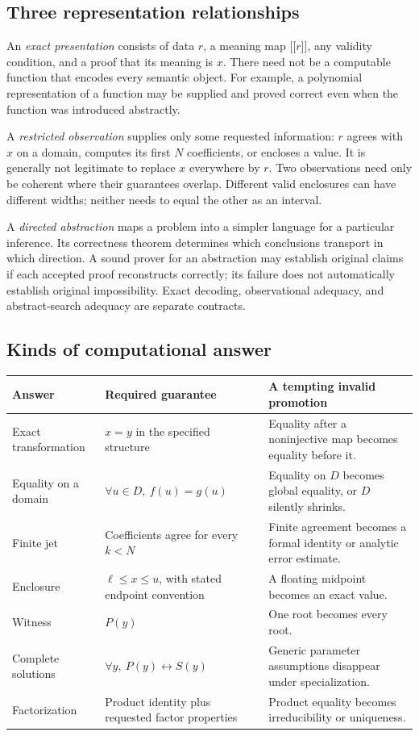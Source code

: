 \documentclass[11pt,letterpaper]{article}
\begin{document}
\subsection{Three representation relationships}
An \emph{exact presentation} consists of data \(r\), a meaning map
\(\lbrack\!\lbrack r\rbrack\!\rbrack\), any validity condition, and a proof that its meaning
is \(x\). There need not be a computable function that encodes every semantic
object. For example, a polynomial representation of a function may be supplied
and proved correct even when the function was introduced abstractly.

A \emph{restricted observation} supplies only some requested information:
\(r\) agrees with \(x\) on a domain, computes its first \(N\) coefficients, or
encloses a value. It is generally not legitimate to replace \(x\) everywhere by
\(r\). Two observations need only be coherent where their guarantees overlap.
Different valid enclosures can have different widths; neither needs to equal
the other as an interval.

A \emph{directed abstraction} maps a problem into a simpler language for a
particular inference. Its correctness theorem determines which conclusions
transport in which direction. A sound prover for an abstraction may establish
original claims if each accepted proof reconstructs correctly; its failure
does not automatically establish original impossibility. Exact decoding,
observational adequacy, and abstract-search adequacy are separate contracts.

\subsection{Kinds of computational answer}
\begin{center}\small
\begin{tabularx}{\textwidth}{@{}P{1.15in}Y Y@{}}
\toprule
Answer & Required guarantee & A tempting invalid promotion\\
\midrule
Exact transformation & \(x=y\) in the specified structure & Equality after a
noninjective map becomes equality before it.\\
Equality on a domain & \(\forall u\in D,\ f(u)=g(u)\) & Equality on \(D\) becomes
global equality, or \(D\) silently shrinks.\\
Finite jet & Coefficients agree for every \(k<N\) & Finite agreement becomes a
formal identity or analytic error estimate.\\
Enclosure & \(\ell\le x\le u\), with stated endpoint convention & A floating
midpoint becomes an exact value.\\
Witness & \(P(y)\) & One root becomes every root.\\
Complete solutions & \(\forall y,\ P(y)\leftrightarrow S(y)\) & Generic
parameter assumptions disappear under specialization.\\
Factorization & Product identity plus requested factor properties & Product
equality becomes irreducibility or uniqueness.\\
\bottomrule
\end{tabularx}
\end{center}
\end{document}
